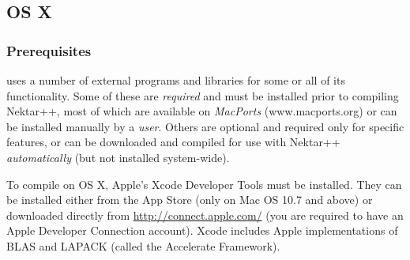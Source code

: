 \subsection{OS X}

\subsubsection{Prerequisites}
\nekpp uses a number of external programs and libraries for some or all of its
functionality. Some of these are \emph{required} and must be installed prior to
compiling Nektar++, most of which are available on \emph{MacPorts}
(www.macports.org) or can be installed manually by a \emph{user}. Others are
optional and required only for specific features, or can be downloaded and
compiled for use with Nektar++ \emph{automatically} (but not installed
system-wide).

\begin{notebox}
  To compile \nekpp on OS X, Apple's Xcode Developer Tools must be
  installed. They can be installed either from the App Store (only on Mac OS
  10.7 and above) or downloaded directly from
  \href{http://connect.apple.com/}{http://connect.apple.com/} (you are required
  to have an Apple Developer Connection account).  Xcode includes Apple
  implementations of BLAS and LAPACK (called the Accelerate Framework).
\end{notebox}

